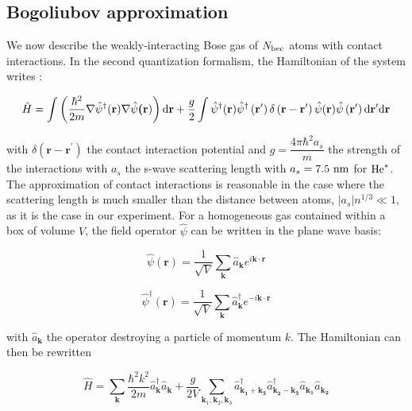 \subsection{Bogoliubov approximation}

\label{sec:bogo_approx}


We now describe the weakly-interacting Bose gas of $N_{\rm{bec}}$ atoms with contact interactions. In the second quantization formalism, the Hamiltonian of the system writes \cite{bogoliubov1947}:


\begin{equation}
    \hat{H}=\int\left(\frac{\hbar^{2}}{2 m} \nabla \hat{\psi}^{\dagger}(\textbf{r}) \nabla \hat{\psi}\textbf{(r})\right) {\rm d} \textbf{r}+\frac{g}{2} \int \hat{\psi}^{\dagger}(\textbf{r}) \hat{\psi}^{\dagger}\left(\textbf{r}^{\prime}\right) \delta\left(\textbf{r}-\textbf{r}^{\prime}\right) \hat{\psi}(\textbf{r}) \hat{\psi}\left(\textbf{r}^{\prime}\right) {\rm d} \textbf{r}^{\prime} {\rm d} \textbf{r}
    \label{eq:bogo_general}
\end{equation}

\noindent with $\delta\left(\textbf{r}-\textbf{r}^{\prime}\right)$ the contact interaction potential and $g=\dfrac{4 \pi \hbar^2 a_s}{m}$ the strength of the interactions with $a_s$ the s-wave scattering length \cite{landau2013quantum} with $a_s = 7.5 \ \rm{nm}$ for $\mathrm{He}^*$. The approximation of contact interactions is reasonable in the case where the scattering length is much smaller than the distance between atoms, $|a_s| n^{1/3} \ll 1$, as it is the case in our experiment. For a homogeneous gas contained within a box of volume $V$, the field operator $\hat{\psi}$ can be written in the plane wave basis:

\begin{equation}
    \hat{\psi}(\bm{r})=\frac{1}{\sqrt{V}} \sum_{\bm{k}} \hat{a}_{\bm{k}} e^{i \bm{k} \cdot \bm{r}}
\end{equation}

\begin{equation}
    \hat{\psi}^{\dagger}(\bm{r})=\frac{1}{\sqrt{V}} \sum_{\bm{k}} \hat{a}^{\dagger}_{\bm{k}} e^{-i \bm{k} \cdot \bm{r}}
\end{equation}

\noindent with $\hat{a}_{\bm{k}}$ the operator destroying a particle of momentum $k$. The Hamiltonian can then be rewritten

\begin{equation}
    \hat{H}=\sum_{\bm{k}}\frac{\hbar^2 k^2}{2m} \hat{a}^{\dagger}_{\bm{k}}  \hat{a}_{\bm{k}} +  \frac{g}{2V} \sum_{\bm{k}_1,\bm{k}_2,\bm{k}_3} \hat{a}^{\dagger}_{\bm{k_1}+\bm{k_3}} \hat{a}^{\dagger}_{\bm{k_2}-\bm{k_3}} \hat{a}_{\bm{k_1}} \hat{a}_{\bm{k_2}} 
\end{equation}

